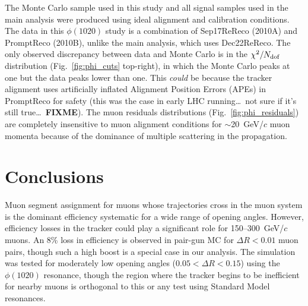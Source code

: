 \documentclass[12pt]{article}
\newcommand{\s}[1]{{\mbox{\scriptsize #1}}}
\begin{document}
The Monte Carlo sample used in this study and all signal samples used
in the main analysis were produced using ideal alignment and
calibration conditions.  The data in this $\phi(1020)$ study is a
combination of Sep17ReReco (2010A) and PromptReco (2010B), unlike the
main analysis, which uses Dec22ReReco.  The only observed discrepancy
between data and Monte Carlo is in the $\chi^2/N_\s{dof}$ distribution
(Fig.~\ref{fig:phi_cuts} top-right), in which the Monte Carlo peaks at
one but the data peaks lower than one.  This {\it could} be because
the tracker alignment uses artificially inflated Alignment Position
Errors (APEs) in PromptReco for safety (this was the case in early LHC
running\ldots\ not sure if it's still true\ldots\ {\bf FIXME}).  The
muon residuals distributions (Fig.~\ref{fig:phi_residuals}) are
completely insensitive to muon alignment conditions for
$\sim$20~GeV/$c$ muon momenta because of the dominance of multiple
scattering in the propagation.

\section{Conclusions}

Muon segment assignment for muons whose trajectories cross in the muon
system is the dominant efficiency systematic for a wide range of
opening angles.  However, efficiency losses in the tracker could play
a significant role for 150--300~GeV/$c$ muons.  An 8\% loss in
efficiency is observed in pair-gun MC for $\Delta R < 0.01$ muon
pairs, though such a high boost is a special case in our analysis.
The simulation was tested for moderately low opening angles ($0.05 <
\Delta R < 0.15$) using the $\phi(1020)$ resonance, though the region
where the tracker begins to be inefficient for nearby muons is
orthogonal to this or any test using Standard Model resonances.
\end{document}
